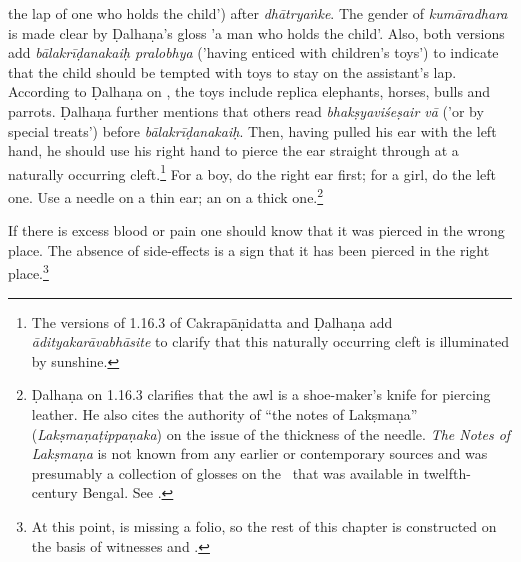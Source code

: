 \begin{translation}
{the lap of one who holds the child') after \emph{dhātryaṅke}. The gender of
\emph{kumāradhara} is made clear by  Ḍalhaṇa's gloss 'a man who holds the
child'. Also, both versions add \emph{bālakrīḍanakaiḥ pralobhya} ('having
enticed with children's toys') to indicate that the child should be tempted
with toys to stay on the assistant's lap. According to Ḍalhaṇa on
, the toys include replica elephants, horses, bulls and
parrots. Ḍalhaṇa further mentions that others read \emph{bhakṣyaviśeṣair vā}
('or by special treats') before \emph{bālakrīḍanakaiḥ}.} Then, having pulled
his ear with the left hand, he should use his right hand to pierce the ear
straight through at a naturally occurring cleft.\footnote{The versions of
1.16.3 of Cakrapāṇidatta \citep[126]{acar-1939} and Ḍalhaṇa
\citep[76]{vulgate} add \emph{ādityakarāvabhāsite} to clarify that this
naturally occurring cleft is illuminated by sunshine.} For a boy, do the right
ear first; for a girl, do the left one. Use a needle on a thin ear; an
 on a thick one.\footnote{Ḍalhaṇa on 1.16.3 \citep[76]{vulgate}
clarifies that the awl is a shoe-maker's knife for piercing leather.    He
also cites the authority of “the notes of Lakṣmaṇa”
(\emph{Lakṣmaṇaṭippaṇaka}) on the issue of the thickness of the needle. 
\textit{The Notes of Lakṣmaṇa} is not known from any earlier or contemporary
sources and was presumably a collection of glosses on the \SS\ that was
available in twelfth-century Bengal. See \citet[IA, 386, and the footnotes
for further literature]{meul-hist}.}
    
    \item [3]  If there is excess blood or pain one should know that it was pierced
    in the wrong place. The absence of side-effects is a sign that it has been pierced 
    in the right place.\footnote{At this point,  is missing a folio, so the rest of this chapter
    is constructed on the basis of witnesses  and 
    .}
    

\end{translation}
